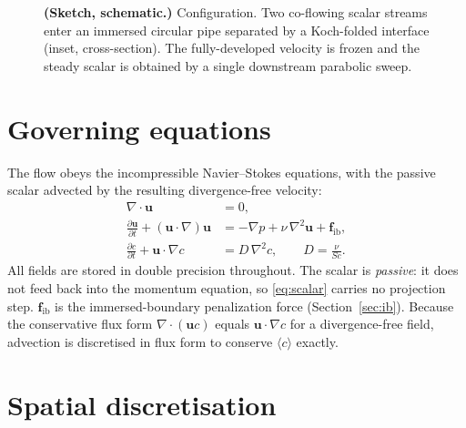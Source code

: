 \documentclass[11pt]{article}
\newcommand{\Sc}{\mathit{Sc}}
\newcommand{\uvec}{\bm{u}}
\begin{document}
\begin{figure}[h]
\caption{\textbf{(Sketch, schematic.)} Configuration. Two co-flowing
scalar streams enter an immersed circular pipe separated by a Koch-folded
interface (inset, cross-section). The fully-developed velocity is frozen
and the steady scalar is obtained by a single downstream parabolic sweep.}
\label{fig:setup}
\end{figure}

\section{Governing equations}

The flow obeys the incompressible Navier--Stokes equations, with the
passive scalar advected by the resulting divergence-free velocity:
\begin{align}
  \nabla \cdot \uvec &= 0, \label{eq:cont}\\
  \frac{\partial \uvec}{\partial t} + (\uvec \cdot \nabla)\uvec
    &= -\nabla p + \nu\,\nabla^2 \uvec + \bm{f}_{\mathrm{ib}},
    \label{eq:mom}\\
  \frac{\partial c}{\partial t} + \uvec \cdot \nabla c
    &= D\,\nabla^2 c, \qquad D = \frac{\nu}{\Sc}. \label{eq:scalar}
\end{align}
All fields are stored in double precision throughout. The scalar is \emph{passive}: it does not feed back into the
momentum equation, so \eqref{eq:scalar} carries no projection step.
$\bm{f}_{\mathrm{ib}}$ is the immersed-boundary penalization force
(Section~\ref{sec:ib}). Because the conservative flux form
$\nabla\!\cdot(\uvec c)$ equals $\uvec\cdot\nabla c$ for a
divergence-free field, advection is discretised in flux form to conserve
$\langle c\rangle$ exactly.

\section{Spatial discretisation}
\end{document}
